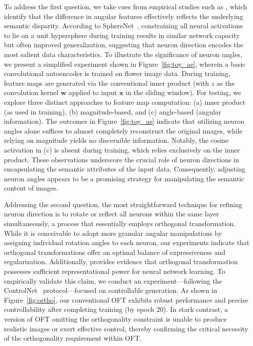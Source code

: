 To address the first question, we take cues from empirical studies such as \cite{liu2018decoupled,chen2020angular}, which identify that the difference in angular features effectively reflects the underlying semantic disparity. According to SphereNet~\cite{liu2017deep}, constraining all neural activations to lie on a unit hypersphere during training results in similar network capacity but often improved generalization, suggesting that neuron direction encodes the most salient data characteristics. To illustrate the significance of neuron angles, we present a simplified experiment shown in Figure~\ref{fig:toy_ae}, wherein a basic convolutional autoencoder is trained on flower image data. During training, feature maps are generated via the conventional inner product (with $z$ as the convolution kernel $\bm{w}$ applied to input $\bm{x}$ in the sliding window). For testing, we explore three distinct approaches to feature map computation: (a) inner product (as used in training), (b) magnitude-based, and (c) angle-based (angular information). The outcomes in Figure~\ref{fig:toy_ae} indicate that utilizing neuron angles alone suffices to almost completely reconstruct the original images, while relying on magnitude yields no discernible information. Notably, the cosine activation in (c) is absent during training, which relies exclusively on the inner product. These observations underscore the crucial role of neuron directions in encapsulating the semantic attributes of the input data. Consequently, adjusting neuron angles appears to be a promising strategy for manipulating the semantic content of images.

Addressing the second question, the most straightforward technique for refining neuron direction is to rotate or reflect all neurons within the same layer simultaneously, a process that essentially employs orthogonal transformation. While it is conceivable to adopt more granular angular manipulations by assigning individual rotation angles to each neuron, our experiments indicate that orthogonal transformations offer an optimal balance of expressiveness and regularization. Additionally, \cite{liu2021orthogonal} provides evidence that orthogonal transformation possesses sufficient representational power for neural network learning. To empirically validate this claim, we conduct an experiment—following the ControlNet~\cite{zhang2023adding} protocol—focused on controllable generation. As shown in Figure~\ref{fig:ortho}, our conventional OFT exhibits robust performance and precise controllability after completing training (by epoch 20). In stark contrast, a version of OFT omitting the orthogonality constraint is unable to produce realistic images or exert effective control, thereby confirming the critical necessity of the orthogonality requirement within OFT.

